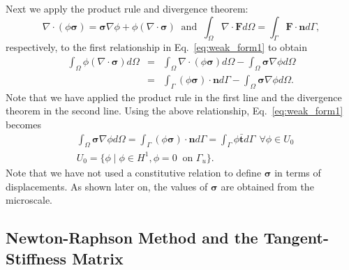 \documentclass[12pt,aps,pre]{revtex4}
\begin{document}
Next we apply the product rule and divergence theorem:
%
\begin{equation}
\nabla \cdot (\phi \pmb{\sigma}) = \pmb{\sigma} \nabla \phi + \phi (\nabla \cdot \pmb{\sigma})\ \text{ and } \ \int_{\Omega} \nabla \cdot \textbf{F} d\Omega = \int_{\Gamma} \textbf{F} \cdot \textbf{n} d\Gamma,
\end{equation}
%
respectively, to the first relationship in Eq.\ \eqref{eq:weak_form1} to obtain
%
\begin{eqnarray}
\int_{\Omega} \phi (\nabla \cdot \pmb{\sigma})d\Omega &=&\int_{\Omega} \nabla \cdot (\phi \pmb{\sigma}) d\Omega - \int_{\Omega} \pmb{\sigma} \nabla \phi d\Omega \nonumber\\
%
&=& \int_{\Gamma} (\phi \pmb{\sigma}) \cdot \pmb{n} d\Gamma - \int_{\Omega} \pmb{\sigma} \nabla \phi d\Omega .
\end{eqnarray}
%
Note that we have applied the product rule in the first line and the divergence theorem in the second line. Using the above relationship, Eq.\ \eqref{eq:weak_form1} becomes
%
\begin{align}
&\int_{\Omega} \pmb{\sigma} \nabla \phi d\Omega = \int_{\Gamma} (\phi \pmb{\sigma}) \cdot \pmb{n} d\Gamma = \int_{\Gamma} \phi \bar{\pmb{t}} d\Gamma \ \ \forall \phi \in U_0 \nonumber\\
 &U_0 = \{\phi \mid \phi \in H^1, \phi = 0 \ \text{ on } \Gamma_u \} .
\label{eq:weak_form}
\end{align}
%
Note that we have not used a constitutive relation to define $\pmb{\sigma}$ in terms of displacements. As shown later on, the values of $\pmb{\sigma}$ are obtained from the microscale.

\subsection{Newton-Raphson Method and the Tangent-Stiffness Matrix}
\end{document}
